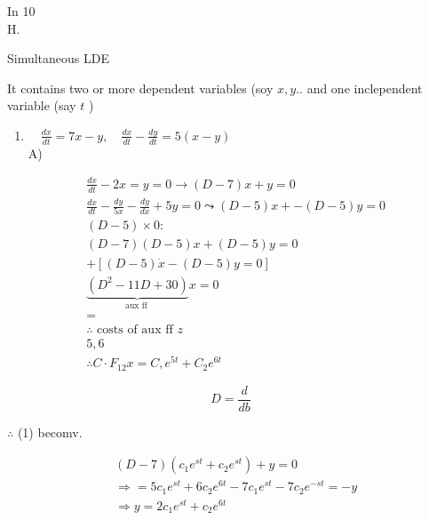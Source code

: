 \documentclass[12pt, a4paper]{article}
\begin{document}
	In 10\\
	H.

	Simultaneous LDE

	It contains two or more dependent variables (soy $x, y .$. and one inclependent variable (say $t$ )

	\begin{enumerate}
		\item $\quad \frac{d x}{d t}=7 x-y, \quad \frac{d x}{d t}-\frac{d y}{d t}=5(x-y)$\\
		      A)
	\end{enumerate}


	\begin{align*}
		 & \frac{d x}{d t}-2 x=y=0 \rightarrow(D-7) x+y=0  \tag{1}                                   \\
		 & \frac{d x}{d t}-\frac{d y}{5 x}-\frac{d y}{d x}+5 y=0 \leadsto(D-5) x+-(D-5) y=0  \tag{2} \\
		 & (D-5) \times 0:                                                                           \\
		 & (D-7)(D-5) x+(D-5) y=0                                                                    \\
		 & +[(D-5) \dot{x}-(D-5) y=0]                                                                \\
		 & \underbrace{\left(D^{2}-11 D+30\right)}_{\text{aux ff }} x=0                              \\
		 & =                                                                                         \\
		 & \therefore \text{ costs of aux ff } z                                                     \\
		 & 5,6                                                                                       \\
		 & \therefore C \cdot F_{12} x=C, e^{5 t}+C_{2} e^{6 t}
	\end{align*}


$$
D=\frac{d}{d b}
$$

	$\therefore$ (1) becomv.

$$
\begin{aligned}
	 & (D-7)\left(c_{1} e^{s t}+c_{2} e^{s t}\right)+y=0                               \\
	 & \Rightarrow=5 c_{1} e^{s t}+6 c_{2} e^{6 t}-7 c_{1} e^{s t}-7 c_{2} e^{-s t}=-y \\
	 & \Rightarrow y=2 c_{1} e^{s t}+c_{2} e^{6 t}
\end{aligned}
$$
\end{document}
